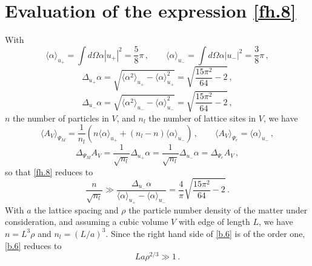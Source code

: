 \documentclass[12pt]{article}
\begin{document}
\section{Evaluation of the expression \eqref{fh.8}}\label{appendixb}
With
\begin{equation}
\langle \alpha \rangle_{u_+} = \int d \Omega \alpha |u_+|^2 = \frac{5}{8} \pi \,, \qquad \langle \alpha \rangle_{u_-} = \int d \Omega \alpha |u_-|^2 =\frac{3}{8} \pi \,,
\label{b.1}
\end{equation}
\begin{equation}
\Delta_{u_+} \alpha = \sqrt{\langle \alpha^2 \rangle_{u_+} -  \langle \alpha \rangle_{u_+}^2}= \sqrt{\frac{15 \pi^2}{64} - 2}\,,
\label{b.2}
\end{equation}
\begin{equation}
\Delta_{u_-} \alpha = \sqrt{\langle \alpha^2 \rangle_{u_-} -  \langle \alpha \rangle_{u_-}^2}= \sqrt{\frac{15 \pi^2}{64} - 2}\,,
\label{b.3}
\end{equation}
$n$ the number of particles in $V$, and $n_l$ the number of lattice sites in $V$, we have
\begin{equation}
\langle A_V \rangle_{\Psi_M} = \frac{1}{n_l} \left( n \langle \alpha \rangle_{u_+} + (n_l-n)\langle \alpha \rangle_{u_-} \right) \,, \qquad  \langle A_V \rangle_{\Psi_e} = \langle \alpha \rangle_{u_-} \,,
\label{b.4}
\end{equation}
\begin{equation}
\Delta_{\Psi_M}A_V  = \frac{1}{\sqrt{n_l}} \Delta_{u_+} \alpha = \frac{1}{\sqrt{n_l}} \Delta_{u_-} \alpha =\Delta_{\Psi_e}A_V \,,
\label{b.5}
\end{equation}
so that \eqref{fh.8} reduces to 
\begin{equation}
\frac{n}{\sqrt{n_l}} \gg \frac{\Delta_{u_-} \alpha}{\langle \alpha \rangle_{u_+} - \langle \alpha \rangle_{u_-}} = \frac{4}{\pi} \sqrt{\frac{15 \pi^2}{64} - 2} \,.
\label{b.6}
\end{equation}
With $a$ the lattice spacing and $\rho$ the particle number density of the matter under consideration, and assuming a cubic volume $V$ with edge of length $L$, we have $n=L^3 \rho$ and $n_l = (L/a)^3$. Since the right hand side of \eqref{b.6} is of the order one, \eqref{b.6} reduces to
\begin{equation}
La\rho^{2/3} \gg 1 \,.
\label{b.7}
\end{equation}
\end{document}
